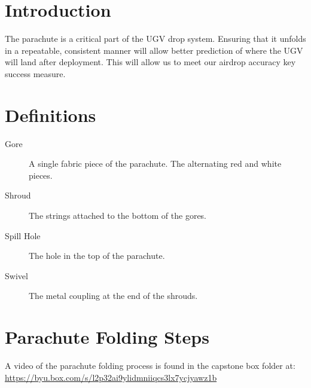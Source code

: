 \documentclass[]{auvsi_doc}
\begin{document}
\begin{AUVSITitlePage}
\begin{artifacttable} 
\end{artifacttable}
\end{AUVSITitlePage}


\section*{Introduction}
The parachute is a critical part of the UGV drop system. Ensuring that it unfolds in a repeatable, consistent manner will allow better prediction
of where the UGV will land after deployment. This will allow us to meet our airdrop accuracy key success measure.

\section*{Definitions}
\begin{description}
	\item[Gore] A single fabric piece of the parachute. The alternating red and white pieces.
	\item[Shroud] The strings attached to the bottom of the gores.
	\item[Spill Hole] The hole in the top of the parachute.
	\item[Swivel] The metal coupling at the end of the shrouds.
\end{description}

\section*{Parachute Folding Steps}
A video of the parachute folding process is found in the capstone box folder at: \url{https://byu.box.com/s/l2p32ai9ylidmniiqcs3lx7ycjyawz1b}
\end{document}
